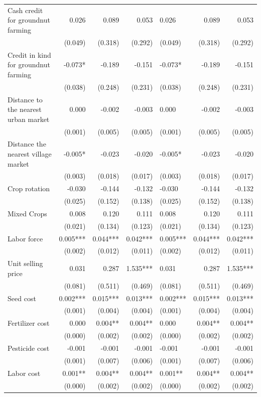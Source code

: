 \documentclass[
]{article}
\begin{document}
\begin{longtable}[t]{lrrrlrr}
Cash credit for groundnut farming & 0.026 & 0.089 & 0.053 & 0.026 & 0.089 & 0.053\\
 & (0.049) & (0.318) & (0.292) & (0.049) & (0.318) & (0.292)\\
Credit in kind for groundnut farming & -0.073* & -0.189 & -0.151 & -0.073* & -0.189 & -0.151\\
 & (0.038) & (0.248) & (0.231) & (0.038) & (0.248) & (0.231)\\
Distance to the nearest urban market & 0.000 & -0.002 & -0.003 & 0.000 & -0.002 & -0.003\\
 & (0.001) & (0.005) & (0.005) & (0.001) & (0.005) & (0.005)\\
Distance the nearest village market & -0.005* & -0.023 & -0.020 & -0.005* & -0.023 & -0.020\\
 & (0.003) & (0.018) & (0.017) & (0.003) & (0.018) & (0.017)\\
Crop rotation & -0.030 & -0.144 & -0.132 & -0.030 & -0.144 & -0.132\\
 & (0.025) & (0.152) & (0.138) & (0.025) & (0.152) & (0.138)\\
Mixed Crops & 0.008 & 0.120 & 0.111 & 0.008 & 0.120 & 0.111\\
 & (0.021) & (0.134) & (0.123) & (0.021) & (0.134) & (0.123)\\
Labor force & 0.005*** & 0.044*** & 0.042*** & 0.005*** & 0.044*** & 0.042***\\
 & (0.002) & (0.012) & (0.011) & (0.002) & (0.012) & (0.011)\\
Unit selling price & 0.031 & 0.287 & 1.535*** & 0.031 & 0.287 & 1.535***\\
 & (0.081) & (0.511) & (0.469) & (0.081) & (0.511) & (0.469)\\
Seed cost & 0.002*** & 0.015*** & 0.013*** & 0.002*** & 0.015*** & 0.013***\\
 & (0.001) & (0.004) & (0.004) & (0.001) & (0.004) & (0.004)\\
Fertilizer cost & 0.000 & 0.004** & 0.004** & 0.000 & 0.004** & 0.004**\\
 & (0.000) & (0.002) & (0.002) & (0.000) & (0.002) & (0.002)\\
Pesticide cost & -0.001 & -0.001 & -0.001 & -0.001 & -0.001 & -0.001\\
 & (0.001) & (0.007) & (0.006) & (0.001) & (0.007) & (0.006)\\
Labor cost & 0.001** & 0.004** & 0.004** & 0.001** & 0.004** & 0.004**\\
 & (0.000) & (0.002) & (0.002) & (0.000) & (0.002) & (0.002)\\

\end{longtable}
\end{document}
